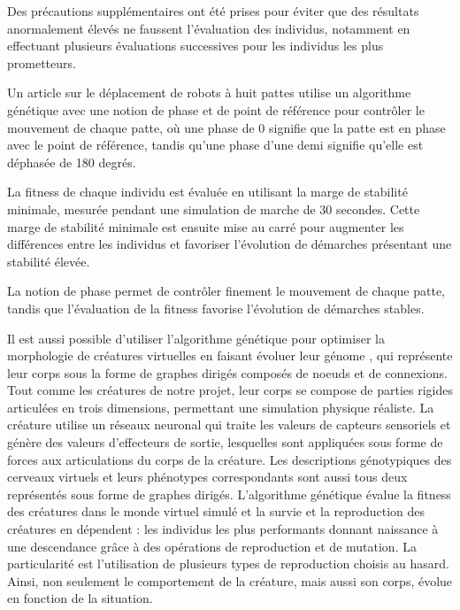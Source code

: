 \documentclass[journal, a4paper]{IEEEtran}
\begin{document}
Des précautions supplémentaires ont été prises pour éviter que des résultats anormalement élevés ne faussent l'évaluation des individus, notamment en effectuant plusieurs évaluations successives pour les individus les plus prometteurs.


Un article sur le déplacement de robots à huit pattes utilise un algorithme génétique avec une notion de phase et de point de référence \cite{2-eigth} pour contrôler le mouvement de chaque patte, où une phase de 0 signifie que la patte est en phase avec le point de référence, tandis qu'une phase d'une demi signifie qu'elle est déphasée de 180 degrés.

La fitness de chaque individu est évaluée en utilisant la marge de stabilité minimale, mesurée pendant une simulation de marche de 30 secondes. Cette marge de stabilité minimale est ensuite mise au carré pour augmenter les différences entre les individus et favoriser l'évolution de démarches présentant une stabilité élevée.

La notion de phase permet de contrôler finement le mouvement de chaque patte, tandis que l'évaluation de la fitness favorise l'évolution de démarches stables.


Il est aussi possible d'utiliser l'algorithme génétique pour optimiser la morphologie de créatures virtuelles en faisant évoluer leur génome \cite{siggraph}, qui représente leur corps sous la forme de graphes dirigés composés de noeuds et de connexions. Tout comme les créatures de notre projet, leur corps se compose de parties rigides articulées en trois dimensions, permettant une simulation physique réaliste. La créature utilise un réseaux neuronal qui traite les valeurs de capteurs sensoriels et génère des valeurs d'effecteurs de sortie, lesquelles sont appliquées sous forme de forces aux articulations du corps de la créature. Les descriptions génotypiques des cerveaux virtuels et leurs phénotypes correspondants sont aussi tous deux représentés sous forme de graphes dirigés. L'algorithme génétique évalue la fitness des créatures dans le monde virtuel simulé et la survie et la reproduction des créatures en dépendent : les individus les plus performants donnant naissance à une descendance grâce à des opérations de reproduction et de mutation. La particularité est l'utilisation de plusieurs types de reproduction choisis au hasard. Ainsi, non seulement le comportement de la créature, mais aussi son corps, évolue en fonction de la situation.
\end{document}
